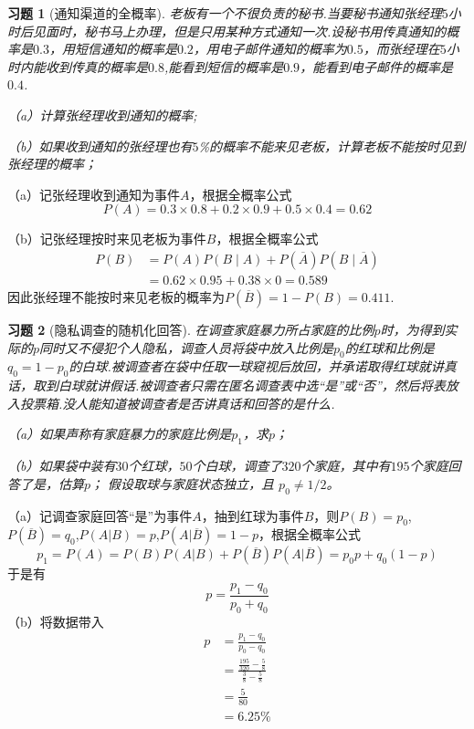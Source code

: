 \documentclass[UTF8,12pt,a4paper,fontset=fandol]{ctexart}
\newtheorem{exercise}{习题}[section]
\begin{document}
\begin{exercise}[通知渠道的全概率]\label{q:Y2.16}
老板有一个不很负责的秘书.当要秘书通知张经理$5$小时后见面时，秘书马上办理，但是只用某种方式通知一次.设秘书用传真通知的概率是$0.3$，用短信通知的概率是$0.2$，用电子邮件通知的概率为$0.5$，而张经理在$5$小时内能收到传真的概率是$0.8$,能看到短信的概率是$0.9$，能看到电子邮件的概率是$0.4$.

（a）计算张经理收到通知的概率;

（b）如果收到通知的张经理也有$5$\%的概率不能来见老板，计算老板不能按时见到张经理的概率；\par{}
\end{exercise}

\begin{solve}\label{a:Y2.16}
（a）记张经理收到通知为事件$A$，根据全概率公式
\[P(A) = 0.3 \times 0.8 + 0.2 \times 0.9 + 0.5 \times 0.4 = 0.62\]

（b）记张经理按时来见老板为事件$B$，根据全概率公式
\[\begin{aligned}P(B)&=P(A)P(B\mid A)+P(\overline A)P(B\mid\overline A)\\&=0.62\times0.95+0.38\times0=0.589\end{aligned}\]
因此张经理不能按时来见老板的概率为$P(\overline{B})=1-P(B)=0.411$.
\end{solve}

\begin{exercise}[隐私调查的随机化回答]\label{q:Y2.17}
在调查家庭暴力所占家庭的比例$p$时，为得到实际的$p$同时又不侵犯个人隐私，调查人员将袋中放入比例是$p_0$的红球和比例是$q_0=1-p_0$的白球.被调查者在袋中任取一球窥视后放回，并承诺取得红球就讲真话，取到白球就讲假话.被调查者只需在匿名调查表中选“是”或“否”，然后将表放入投票箱.没人能知道被调查者是否讲真话和回答的是什么.

（a）如果声称有家庭暴力的家庭比例是$p_1$，求$p$；

（b）如果袋中装有$30$个红球，$50$个白球，调查了$320$个家庭，其中有$195$个家庭回答了是，估算$p$； 假设取球与家庭状态独立，且 $p_0\ne1/2$。\par{}
\end{exercise}

\begin{solve}\label{a:Y2.17}
（a）记调查家庭回答“是”为事件$A$，抽到红球为事件$B$，则$P(B)=p_0$,$P(\overline{B})=q_0$,$P(A|B)=p$,$P(A|\overline{B})=1-p$，根据全概率公式
\[{p_1} = P(A) = P(B)P(A|B) + P(\overline B )P(A|\overline B ) = {p_0}p + {q_0}(1 - p)\]
于是有
\[p = \frac{{{p_1} - {q_0}}}{{{p_0} + {q_0}}}\]
（b）将数据带入
\[\begin{aligned}p &= \frac{{{p_1} - {q_0}}}{{{p_0} - {q_0}}} \\&= \frac{{\frac{{195}}{{320}} - \frac{5}{8}}}{{\frac{3}{8} - \frac{5}{8}}} \\&= \frac{5}{{80}} \\&= 6.25\% \end{aligned}\]
\end{solve}
\end{document}
